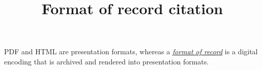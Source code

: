 \title{Format of record citation}



PDF and HTML are presentation formats,
 whereas a \emph{\href{https://rivervalley.io/format-of-record/}{format of record}}
 \autocite{bazargan_format_of_record} is a digital encoding
 that is archived and rendered into presentation formats.


